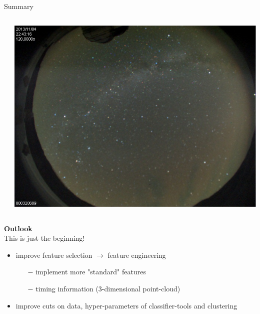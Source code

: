 \begin{frame}[t]{Summary}
\begin{columns}[onlytextwidth]
\begin{column}{0.3\textwidth}
        \end{column}
        \begin{column}{0.3\textwidth}
            \includegraphics[width=\textwidth]{fig/cond.png}
        \end{column}
    \end{columns}
\textbf{{\color{tugreen} Outlook}} \\
This is just the beginning!
\begin{itemize}
    \item improve feature selection $\rightarrow$ feature engineering
        \begin{itemize}
            \item[$-$] implement more "standard" features
            \item[$-$] timing information (3-dimensional point-cloud)
        \end{itemize}
    \item improve cuts on data, hyper-parameters of classifier-tools and clustering
\end{itemize}
\end{frame}
